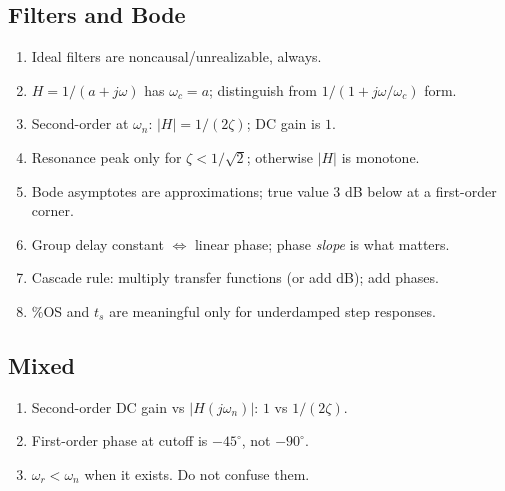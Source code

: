 \documentclass[11pt]{article}
\begin{document}
\subsection{Filters and Bode}
\begin{enumerate}[resume,leftmargin=*]
  \item Ideal filters are noncausal/unrealizable, always.
  \item $H=1/(a+j\omega)$ has $\omega_c = a$; distinguish from $1/(1+j\omega/\omega_c)$ form.
  \item Second-order at $\omega_n$: $|H|=1/(2\zeta)$; DC gain is $1$.
  \item Resonance peak only for $\zeta<1/\sqrt{2}$; otherwise $|H|$ is monotone.
  \item Bode asymptotes are approximations; true value 3 dB below at a first-order corner.
  \item Group delay constant $\Leftrightarrow$ linear phase; phase \emph{slope} is what matters.
  \item Cascade rule: multiply transfer functions (or add dB); add phases.
  \item \%OS and $t_s$ are meaningful only for underdamped step responses.
\end{enumerate}

\subsection{Mixed}
\begin{enumerate}[resume,leftmargin=*]
  \item Second-order DC gain vs $|H(j\omega_n)|$: $1$ vs $1/(2\zeta)$.
  \item First-order phase at cutoff is $-45^\circ$, not $-90^\circ$.
  \item $\omega_r < \omega_n$ when it exists. Do not confuse them.
\end{enumerate}
\end{document}
